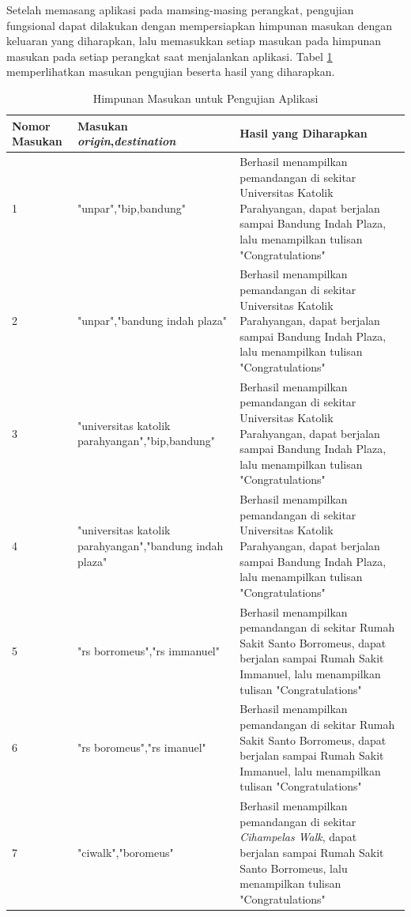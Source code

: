 Setelah memasang aplikasi pada mamsing-masing perangkat, pengujian fungsional dapat dilakukan dengan mempersiapkan himpunan masukan dengan keluaran yang diharapkan, lalu memasukkan setiap masukan pada himpunan masukan pada setiap perangkat saat menjalankan aplikasi. Tabel \ref{tab:input-test} memperlihatkan masukan pengujian beserta hasil yang diharapkan. 

\begin{table}[]
    \centering
    \caption{Himpunan Masukan untuk Pengujian Aplikasi}
    \begin{tabular}{|p{3cm}||p{5cm}|p{7cm}|}
    \hline
       Nomor Masukan & Masukan \textit{origin},\textit{destination}  & Hasil yang Diharapkan\\
    \hline  \hline
     1 & "unpar","bip,bandung"   & Berhasil menampilkan pemandangan di sekitar Universitas Katolik Parahyangan, dapat berjalan sampai Bandung Indah Plaza, lalu menampilkan tulisan "Congratulations"\\ \hline
     2 & "unpar","bandung indah plaza" & 
     Berhasil menampilkan pemandangan di sekitar Universitas Katolik Parahyangan, dapat berjalan sampai Bandung Indah Plaza, lalu menampilkan tulisan "Congratulations"\\ 
     \hline
     3 & "universitas katolik parahyangan","bip,bandung" & Berhasil menampilkan pemandangan di sekitar Universitas Katolik Parahyangan, dapat berjalan sampai Bandung Indah Plaza, lalu menampilkan tulisan "Congratulations"\\    \hline
     4 & "universitas katolik parahyangan","bandung indah plaza" & Berhasil menampilkan pemandangan di sekitar Universitas Katolik Parahyangan, dapat berjalan sampai Bandung Indah Plaza, lalu menampilkan tulisan "Congratulations"\\ \hline
     5 & "rs borromeus","rs immanuel" & Berhasil menampilkan pemandangan di sekitar Rumah Sakit Santo Borromeus, dapat berjalan sampai Rumah Sakit Immanuel, lalu menampilkan tulisan "Congratulations"\\ \hline
     6 & "rs boromeus","rs imanuel" & Berhasil menampilkan pemandangan di sekitar Rumah Sakit Santo Borromeus, dapat berjalan sampai Rumah Sakit Immanuel, lalu menampilkan tulisan "Congratulations" \\ \hline
     7 & "ciwalk","boromeus" & Berhasil menampilkan pemandangan di sekitar \textit{Cihampelas Walk}, dapat berjalan sampai Rumah Sakit Santo Borromeus, lalu menampilkan tulisan "Congratulations" \\
     \hline
    \end{tabular}
    \label{tab:input-test}
\end{table}

